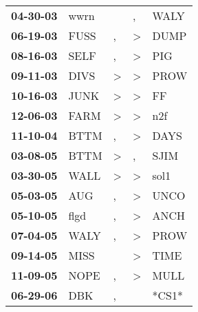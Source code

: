 \begin{supertabular}{p{0.07\textwidth}p{0.06\textwidth}p{0.02\textwidth}p{0.02\textwidth}p{0.06\textwidth}}
 \textbf{04-30-03\textsuperscript{}} &           wwrn\textsuperscript{} &                  &                , &  WALY\textsuperscript{} \\
 \textbf{06-19-03\textsuperscript{}} &           FUSS\textsuperscript{} &                , &     \textgreater &  DUMP\textsuperscript{} \\
 \textbf{08-16-03\textsuperscript{}} &           SELF\textsuperscript{} &                , &     \textgreater &   PIG\textsuperscript{} \\
 \textbf{09-11-03\textsuperscript{}} &           DIVS\textsuperscript{} &     \textgreater &     \textgreater &  PROW\textsuperscript{} \\
 \textbf{10-16-03\textsuperscript{}} &           JUNK\textsuperscript{} &     \textgreater &     \textgreater &    FF\textsuperscript{} \\
 \textbf{12-06-03\textsuperscript{}} &           FARM\textsuperscript{} &     \textgreater &     \textgreater &   n2f\textsuperscript{} \\
 \textbf{11-10-04\textsuperscript{}} &           BTTM\textsuperscript{} &                , &     \textgreater &  DAYS\textsuperscript{} \\
 \textbf{03-08-05\textsuperscript{}} &           BTTM\textsuperscript{} &     \textgreater &                , &  SJIM\textsuperscript{} \\
 \textbf{03-30-05\textsuperscript{}} &           WALL\textsuperscript{} &     \textgreater &     \textgreater &  sol1\textsuperscript{} \\
 \textbf{05-03-05\textsuperscript{}} &            AUG\textsuperscript{} &                , &     \textgreater &  UNCO\textsuperscript{} \\
 \textbf{05-10-05\textsuperscript{}} &           flgd\textsuperscript{} &                , &     \textgreater &  ANCH\textsuperscript{} \\
 \textbf{07-04-05\textsuperscript{}} &           WALY\textsuperscript{} &                , &     \textgreater &  PROW\textsuperscript{} \\
 \textbf{09-14-05\textsuperscript{}} &           MISS\textsuperscript{} &                  &     \textgreater &  TIME\textsuperscript{} \\
 \textbf{11-09-05\textsuperscript{}} &           NOPE\textsuperscript{} &                , &     \textgreater &  MULL\textsuperscript{} \\
 \textbf{06-29-06\textsuperscript{}} &            DBK\textsuperscript{} &                , &                  &                   *CS1* \\

\end{supertabular}
